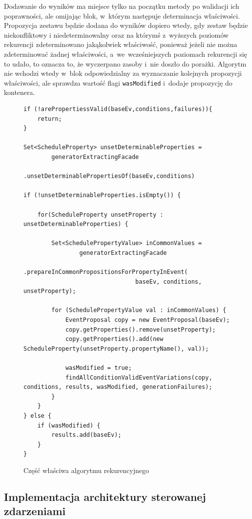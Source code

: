 \documentclass[a4paper]{book}
\begin{document}
{Dodawanie do wyników ma miejsce tylko na początku metody po walidacji ich poprawności, ale omijając blok, w~którym następuje determinacja właściwości. Propozycja zestawu będzie dodana do wyników dopiero wtedy, gdy zestaw będzie niekonfliktowy i niedeterminowalny oraz na którymś z~wyższych poziomów rekurencji zdeterminowano jakąkolwiek właściwość, ponieważ jeżeli nie można zdeterminować żadnej właściwości, a~we~wcześniejszych poziomach rekurencji się to udało, to oznacza to, że wyczerpano zasoby i~nie doszło do porażki. Algorytm nie wchodzi wtedy w~blok odpowiedzialny za wyznaczanie kolejnych propozycji właściwości, ale sprawdza wartość flagi \lstinline|wasModified| i~dodaje propozycję do kontenera.
\begin{figure}
\begin{lstlisting}
if (!arePropertiessValid(baseEv,conditions,failures)){
	return;
}

Set<ScheduleProperty> unsetDeterminableProperties = 
		generatorExtractingFacade
			.unsetDeterminablePropertiesOf(baseEv,conditions)

if (!unsetDeterminableProperties.isEmpty()) {
				
	for(ScheduleProperty unsetProperty : unsetDeterminableProperties) {

		Set<SchedulePropertyValue> inCommonValues = 
				generatorExtractingFacade
						.prepareInCommonPropositionsForPropertyInEvent(
								baseEv, conditions, unsetProperty);

		for (SchedulePropertyValue val : inCommonValues) {
			EventProposal copy = new EventProposal(baseEv);
			copy.getProperties().remove(unsetProperty);
			copy.getProperties().add(new ScheduleProperty(unsetProperty.propertyName(), val));

			wasModified = true;
			findAllConditionValidEventVariations(copy, conditions, results, wasModified, generationFailures);
		}	
	}
} else {
	if (wasModified) {
		results.add(baseEv);
	}
}

\end{lstlisting}
\caption{Część właściwa algorytmu rekurencyjnego}
\label{id:fig:listing:recursion}
\end{figure}


\subsection{Implementacja architektury sterowanej zdarzeniami}

}
\end{document}

